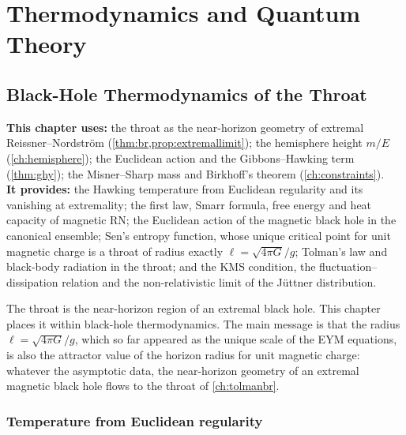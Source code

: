 \part{Thermodynamics and Quantum Theory}
\chapter{Black-Hole Thermodynamics of the Throat}
\label{ch:thermo}

\begin{usesbox}
\textbf{This chapter uses:} the throat as the near-horizon geometry of extremal Reissner--Nordstr\"om (\cref{thm:br,prop:extremallimit}); the hemisphere height $m/E$ (\cref{ch:hemisphere}); the Euclidean action and the Gibbons--Hawking term (\cref{thm:ghy}); the Misner--Sharp mass and Birkhoff's theorem (\cref{ch:constraints}).\\
\textbf{It provides:} the Hawking temperature from Euclidean regularity and its vanishing at extremality; the first law, Smarr formula, free energy and heat capacity of magnetic RN; the Euclidean action of the magnetic black hole in the canonical ensemble; Sen's entropy function, whose unique critical point for unit magnetic charge is a throat of radius exactly $\ell=\sqrt{4\pi G}/g$; Tolman's law and black-body radiation in the throat; and the KMS condition, the fluctuation--dissipation relation and the non-relativistic limit of the J\"uttner distribution.
\end{usesbox}

The throat is the near-horizon region of an extremal black hole. This chapter places it within black-hole thermodynamics. The main message is that the radius $\ell=\sqrt{4\pi G}/g$, which so far appeared as the unique scale of the EYM equations, is also the attractor value of the horizon radius for unit magnetic charge: whatever the asymptotic data, the near-horizon geometry of an extremal magnetic black hole flows to the throat of \cref{ch:tolmanbr}.

\section{Temperature from Euclidean regularity}


